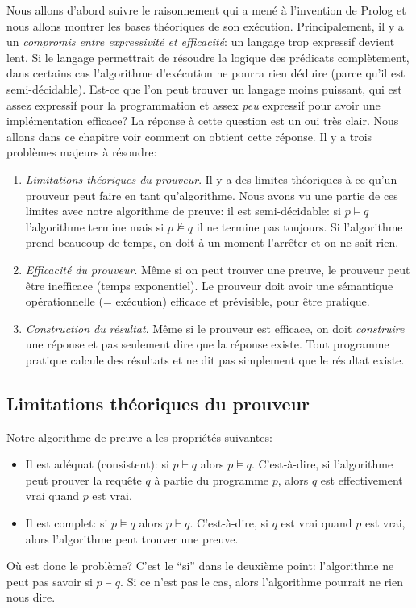 Nous allons d'abord suivre le raisonnement qui a mené à l'invention de Prolog
et nous allons montrer les bases théoriques de son exécution.
Principalement, il y a un {\em compromis entre expressivité et efficacité}:
un langage trop expressif devient lent.
Si le langage permettrait de résoudre la logique des prédicats complètement,
dans certains cas l'algorithme d'exécution ne pourra rien déduire (parce qu'il est semi-décidable).
Est-ce que l'on peut trouver un langage moins puissant, qui est assez expressif pour la programmation
et assex {\em peu} expressif pour avoir une implémentation efficace?
La réponse à cette question est un oui très clair.
Nous allons dans ce chapitre voir comment on obtient cette réponse.
Il y a trois problèmes majeurs à résoudre:
\begin{enumerate}
\item {\em Limitations théoriques du prouveur}.
Il y a des limites théoriques à ce qu'un prouveur peut faire en tant qu'algorithme.
Nous avons vu une partie de ces limites avec notre algorithme de preuve:
il est semi-décidable: si $p \models q$ l'algorithme termine mais si $p \not\models q$ il ne termine pas toujours.
Si l'algorithme prend beaucoup de temps, on doit à un moment l'arrêter et on ne sait rien.
\item {\em Efficacité du prouveur}.
Même si on peut trouver une preuve, le prouveur peut être inefficace (temps exponentiel).
Le prouveur doit avoir une sémantique opérationnelle (= exécution) efficace et prévisible, pour être pratique.
\item {\em Construction du résultat}.
Même si le prouveur est efficace, on doit {\em construire} une réponse et pas seulement dire que la réponse existe.
Tout programme pratique calcule des résultats et ne dit pas simplement que le résultat existe.
\end{enumerate}

\subsection{Limitations théoriques du prouveur}

Notre algorithme de preuve a les propriétés suivantes:
\begin{itemize}
\item Il est adéquat (consistent): si $p \vdash q$ alors $p \models q$.
C'est-à-dire, si l'algorithme peut prouver la requête $q$ à partie du programme $p$,
alors $q$ est effectivement vrai quand $p$ est vrai.
\item Il est complet: si $p \models q$ alors $p \vdash q$.
C'est-à-dire, si $q$ est vrai quand $p$ est vrai, alors l'algorithme peut trouver une preuve.
\end{itemize}
Où est donc le problème?
C'est le ``si'' dans le deuxième point: l'algorithme ne peut pas savoir si $p \models q$.
Si ce n'est pas le cas, alors l'algorithme pourrait ne rien nous dire.

